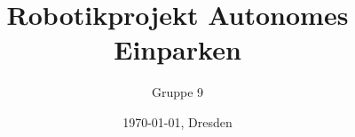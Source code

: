 \documentclass[11pt]{scrartcl}
\title{Robotikprojekt Autonomes Einparken}
\author{Gruppe 9}
\date{\today{}, Dresden}
\newcommand{\onlyinsubfile}[1]{#1}
\newcommand{\notinsubfile}[1]{}
\begin{document}
\renewcommand{\onlyinsubfile}[1]{}
\renewcommand{\notinsubfile}[1]{#1}

\maketitle
\tableofcontents






\end{document}
